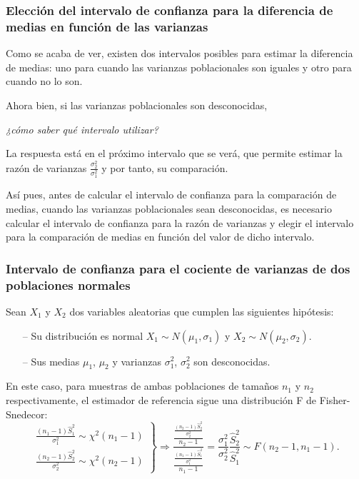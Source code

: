\begin{frame}
\frametitle{Elección del intervalo de confianza para la diferencia de medias en función de las varianzas}
Como se acaba de ver, existen dos intervalos posibles para estimar la diferencia de medias: uno para cuando las varianzas poblacionales son iguales y otro para cuando no lo son.

Ahora bien, si las varianzas poblacionales son desconocidas, 
\begin{center}
\emph{¿cómo saber qué intervalo utilizar?}
\end{center}

La respuesta está en el próximo intervalo que se verá, que permite estimar la razón de varianzas $\frac{\sigma_2^2}{\sigma_1^2}$ y por tanto, su comparación.

Así pues, antes de calcular el intervalo de confianza para la comparación de medias, cuando las varianzas poblacionales sean desconocidas, es necesario calcular el intervalo de confianza para la razón de varianzas y elegir el intervalo para la comparación de medias en función del valor de dicho intervalo.
\end{frame}


\begin{frame}
\frametitle{Intervalo de confianza para el cociente de varianzas de dos poblaciones normales}
Sean $X_1$ y $X_2$ dos variables aleatorias que cumplen las siguientes hipótesis:
\begin{itemize}
\item[--] Su distribución es normal $X_1\sim N(\mu_1,\sigma_1)$ y $X_2\sim N(\mu_2,\sigma_2)$.
\item[--] Sus medias $\mu_1$, $\mu_2$ y varianzas $\sigma_1^2$, $\sigma_2^2$ son desconocidas.
\end{itemize}
En este caso, para muestras de ambas poblaciones de tamaños $n_1$ y $n_2$ respectivamente, el estimador de referencia sigue una distribución F de Fisher-Snedecor:
\[
\left.
\begin{array}{l}
\displaystyle \frac{(n_1-1)\hat{S}_1^2}{\sigma_1^2}\sim \chi^2(n_1-1) \\
\displaystyle \frac{(n_2-1)\hat{S}_2^2}{\sigma_2^2}\sim \chi^2(n_2-1)
\end{array}
\right\}
\Rightarrow
\frac{\frac{\frac{(n_2-1)\hat{S}_2^2}{\sigma_2^2}}{n_2-1}}{\frac{\frac{(n_1-1)\hat{S}_1^2}{\sigma_1^2}}{n_1-1}} =
\frac{\sigma_1^2}{\sigma_2^2}\frac{\hat{S}_2^2}{\hat{S}_1^2}\sim F(n_2-1,n_1-1).
\]
\end{frame}


